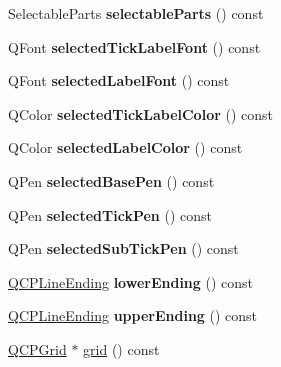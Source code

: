 \begin{DoxyCompactItemize}
\item 
\mbox{\label{class_q_c_p_axis_a1d12d157756c114f4e57517c62177181}} 
Selectable\+Parts {\bfseries selectable\+Parts} () const
\item 
\mbox{\label{class_q_c_p_axis_a09817512bef8ddfb669a6828f9c855bc}} 
Q\+Font {\bfseries selected\+Tick\+Label\+Font} () const
\item 
\mbox{\label{class_q_c_p_axis_a1399d614f7c307159bfec938a069203d}} 
Q\+Font {\bfseries selected\+Label\+Font} () const
\item 
\mbox{\label{class_q_c_p_axis_a75f11d3031a11559f3e984e916fcde2c}} 
Q\+Color {\bfseries selected\+Tick\+Label\+Color} () const
\item 
\mbox{\label{class_q_c_p_axis_a7adea64ef4b715e7a1c519fff2b110b8}} 
Q\+Color {\bfseries selected\+Label\+Color} () const
\item 
\mbox{\label{class_q_c_p_axis_a0d54314ab3053fd0fb77294a0e7f08cb}} 
Q\+Pen {\bfseries selected\+Base\+Pen} () const
\item 
\mbox{\label{class_q_c_p_axis_a76b52a6d824ccf9a95eb024251e1b833}} 
Q\+Pen {\bfseries selected\+Tick\+Pen} () const
\item 
\mbox{\label{class_q_c_p_axis_a73c147bb2c5598edbb842adc2da8a7bf}} 
Q\+Pen {\bfseries selected\+Sub\+Tick\+Pen} () const
\item 
\mbox{\label{class_q_c_p_axis_a0cc60e5694ed4df6a2c3554e53ee6ae7}} 
\hyperlink{class_q_c_p_line_ending}{Q\+C\+P\+Line\+Ending} {\bfseries lower\+Ending} () const
\item 
\mbox{\label{class_q_c_p_axis_a9feaf5f78286693e89221bc205f9389a}} 
\hyperlink{class_q_c_p_line_ending}{Q\+C\+P\+Line\+Ending} {\bfseries upper\+Ending} () const
\item 
\hyperlink{class_q_c_p_grid}{Q\+C\+P\+Grid} $\ast$ \hyperlink{class_q_c_p_axis_a63f1dd2df663680d2a8d06c19592dd63}{grid} () const
\item 

\end{DoxyCompactItemize}
